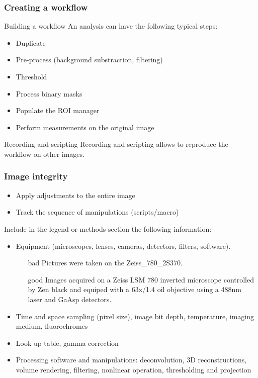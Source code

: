 \documentclass[ignorenonframetext,aspectratio=169,10pt,xcolor=table]{beamer}
\begin{document}
\begin{frame} \frametitle{Creating a workflow}

  \begin{block}{Building a workflow}
    An analysis can have the following typical steps:
    \begin{itemize}
      \item Duplicate
      \item Pre-process (background substraction, filtering)
      \item Threshold
      \item Process binary masks
      \item Populate the ROI manager
      \item Perform measurements on the original image
    \end{itemize}
  \end{block}

  \begin{block}{Recording and scripting}
    Recording and scripting allows to reproduce the workflow on other images.
  \end{block}

\end{frame}


\begin{frame} \frametitle{Image integrity}

  \begin{itemize}
  \item Apply adjustments to the entire image
  \item Track the sequence of manipulations (scripts/macro)
  \end{itemize}

  Include in the legend or methods section the following
  information:
  \begin{itemize}\small

  \item Equipment (microscopes, lenses, cameras, detectors,
    filters, software).

     \begin{itemize}
     \item[bad] Pictures were taken on the Zeiss\_780\_2S370.
     \item[good] Images acquired on a Zeiss LSM 780 inverted
    microscope controlled by Zen black and equiped with a 63x/1.4 oil
    objective using a 488nm laser and GaAsp detectors.
     \end{itemize}

  \item Time and space sampling (pixel size), image bit depth,
    temperature, imaging medium, fluorochromes
  \item Look up table, gamma correction
  \item Processing software and manipulations: deconvolution, 3D reconstructions,
   volume rendering, filtering, nonlinear operation, thresholding and projection
  \end{itemize}


\end{frame}
\end{document}
